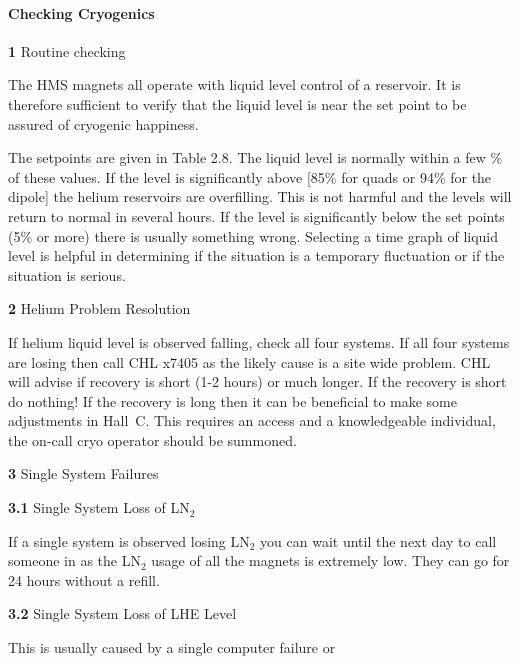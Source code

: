 {\paragraph{Checking Cryogenics}

\begin{description}
\item{\bf 1}\hskip0.1in Routine checking
\item{}\hskip0.3in The HMS magnets all operate with liquid level control of a
reservoir. It is therefore sufficient to verify that the liquid level
is near the set point to be assured of cryogenic happiness.
\end{description}

\begin{description}
\item{}\hskip0.3in The setpoints are given in Table 2.8.  The liquid
level is normally within a few \% of these
values.  If
the level is significantly above [85\% for quads or 94\% for the dipole]
the helium reservoirs are overfilling.  This is not harmful and the
levels will return to normal in several hours.  If the level is
significantly below the set points (5\% or more) there is usually
something wrong.  Selecting a time graph of liquid level is helpful in
determining if the situation is a temporary fluctuation or if the
situation is serious.
\item{\bf 2}\hskip0.1in Helium Problem Resolution
\item{}\hskip0.3in If helium liquid level is observed falling, check all four
systems.  If all four systems are losing then call CHL x7405 as the
likely cause is a site wide problem.  CHL will advise if recovery is
short (1-2 hours) or much longer.  If the recovery is short do nothing!
If the recovery is long then it can be beneficial to make some
adjustments in Hall~C.  This requires an access and a knowledgeable
individual, the on-call cryo operator
should be summoned.
\item{\bf 3}\hskip0.1in Single System Failures
\item{\bf 3.1}\hskip0.1in Single System Loss of LN$_2$
\item{}\hskip0.3in If a single system is observed losing LN$_2$ you can
wait until
the next day to call someone in as the LN$_2$ usage of all the magnets
is extremely low.  They can go for 24 hours without a refill.
\item{\bf 3.2}\hskip0.1in Single System Loss of LHE Level
\item{}\hskip0.3in This is usually caused by a single computer failure or

\end{description}}
